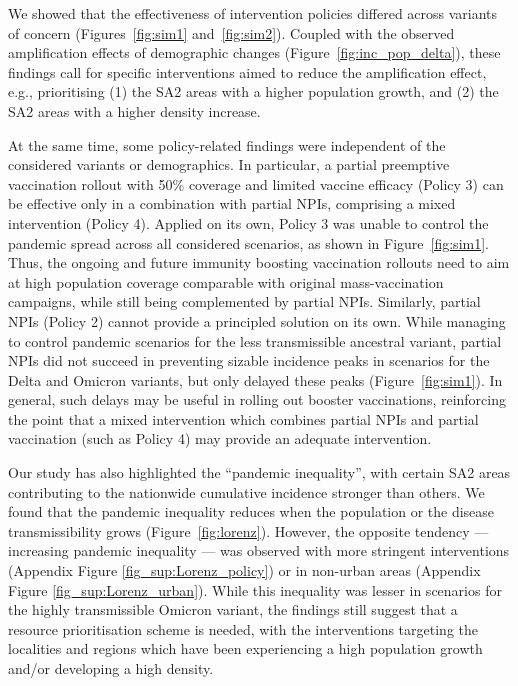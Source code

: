 \documentclass{article}
\begin{document}
We showed that the effectiveness of intervention policies differed across variants of concern (Figures~\ref{fig:sim1} and~\ref{fig:sim2}). Coupled with the observed amplification effects of demographic changes (Figure~\ref{fig:inc_pop_delta}), these findings call for specific interventions aimed to reduce the amplification effect, e.g., prioritising (1) the SA2 areas with a higher population growth, and (2) the SA2 areas with a higher density increase. 

At the same time, some policy-related findings were independent of the considered variants or demographics. In particular, a partial preemptive vaccination rollout with 50\% coverage and limited vaccine efficacy (Policy 3) can be effective only in a combination with partial NPIs, comprising a mixed intervention (Policy 4). Applied on its own, Policy 3 was unable to control the pandemic spread across all considered scenarios, as shown in Figure~\ref{fig:sim1}. Thus, the ongoing and future immunity boosting vaccination rollouts need to aim at high population coverage comparable with  original mass-vaccination campaigns, while still being complemented by  partial NPIs. Similarly, partial NPIs (Policy 2) cannot provide a principled solution on its own. While managing to control pandemic scenarios for the less transmissible ancestral variant, partial NPIs did not succeed in preventing sizable incidence peaks in scenarios for the Delta and Omicron variants, but only delayed these peaks (Figure~\ref{fig:sim1}). In general, such  delays may be useful in rolling out booster vaccinations, reinforcing the point that a mixed intervention which combines partial NPIs and partial vaccination (such as Policy 4) may provide an adequate intervention.  

Our study has also highlighted the ``pandemic inequality'', with certain SA2 areas contributing to the nationwide cumulative incidence stronger than others.
We found that the pandemic inequality reduces when the population or the disease transmissibility grows (Figure~\ref{fig:lorenz}). However, the opposite tendency --- increasing pandemic inequality --- was observed with more stringent interventions (Appendix Figure \ref{fig_sup:Lorenz_policy}) or in non-urban areas (Appendix Figure \ref{fig_sup:Lorenz_urban}). 
While this inequality was lesser in scenarios for the  highly transmissible  Omicron variant, the findings still suggest that a resource prioritisation scheme is needed, with the interventions targeting the localities and regions which have been experiencing a high population growth and/or developing a high density. 
\end{document}
